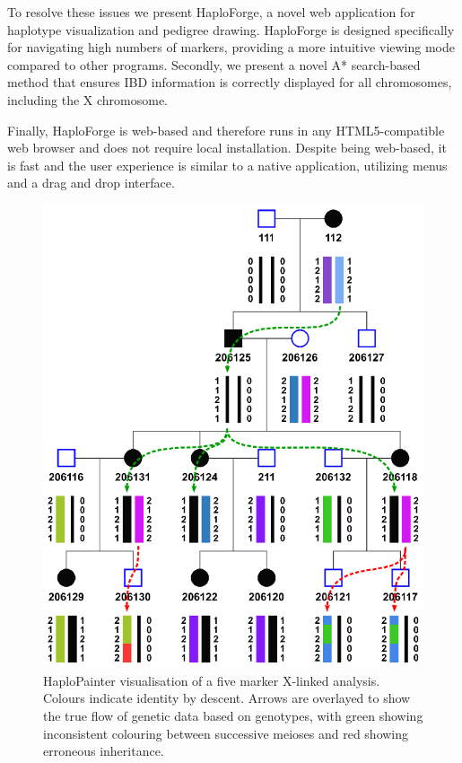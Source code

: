 \documentclass{bioinfo}
\numberwithin{equation}{section}
\def\haplo{{HaploForge}}
\def\hpainter{{HaploPainter}}
\begin{document}
To resolve these issues we present \haplo{}, a novel web application for haplotype visualization and pedigree drawing. \haplo{} is designed specifically for navigating high numbers of markers, providing a more intuitive viewing mode compared to other programs. 
Secondly, we present a novel A* search-based method that ensures IBD information is correctly displayed for all chromosomes, including the X chromosome.

Finally, \haplo{} is web-based and therefore runs in any HTML5-compatible web browser and does not require local installation. Despite being web-based, it is fast and the user experience is similar to a native application, utilizing menus and a drag and drop interface.

\begin{figure}[!tpb]
	\centerline{\includegraphics[scale=1]{hpainter_inheritance_small.4.eps}}\caption{\hpainter{} visualisation of a five marker X-linked analysis. Colours indicate identity by descent. Arrows are overlayed to show the true flow of genetic data based on genotypes, with green showing inconsistent colouring between successive meioses and red showing erroneous inheritance.}\label{fig:hpainterx}
\end{figure}
\end{document}
